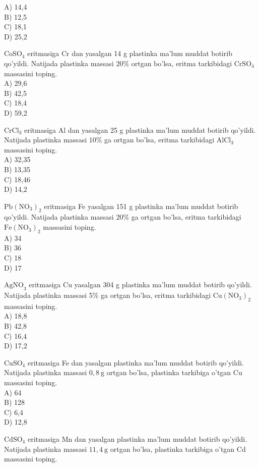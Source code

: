 A) 14,4\\
B) 12,5\\
C) 18,1\\
D) 25,2
  \item $\mathrm{CoSO}_{4}$ eritmasiga Cr dan yasalgan 14 g plastinka ma'lum muddat botirib qo'yildi. Natijada plastinka massasi $20 \%$ ortgan bo'lsa, eritma tarkibidagi $\mathrm{CrSO}_{4}$ massasini toping.\\
A) 29,6\\
B) 42,5\\
C) 18,4\\
D) 59,2
  \item $\mathrm{CrCl}_{3}$ eritmasiga Al dan yasalgan 25 g plastinka ma'lum muddat botirib qo'yildi. Natijada plastinka massasi $10 \%$ ga ortgan bo'lsa, eritma tarkibidagi $\mathrm{AlCl}_{3}$ massasini toping.\\
A) 32,35\\
B) 13,35\\
C) 18,46\\
D) 14,2
  \item $\mathrm{Pb}\left(\mathrm{NO}_{3}\right)_{2}$ eritmasiga Fe yasalgan 151 g plastinka ma'lum muddat botirib qo'yildi. Natijada plastinka massasi $20 \%$ ga ortgan bo'lsa, eritma tarkibidagi $\mathrm{Fe}\left(\mathrm{NO}_{3}\right)_{2}$ massasini toping.\\
A) 34\\
B) 36\\
C) 18\\
D) 17
  \item $\mathrm{AgNO}_{3}$ eritmasiga Cu yasalgan 304 g plastinka ma'lum muddat botirib qo'yildi. Natijada plastinka massasi 5\% ga ortgan bo'lsa, eritma tarkibidagi $\mathrm{Cu}\left(\mathrm{NO}_{3}\right)_{2}$ massasini toping.\\
A) 18,8\\
B) 42,8\\
C) 16,4\\
D) 17,2
  \item $\mathrm{CuSO}_{4}$ eritmasiga Fe dan yasalgan plastinka ma'lum muddat botirib qo'yildi. Natijada plastinka massasi $0,8 \mathrm{~g}$ ortgan bo'lsa, plastinka tarkibiga o'tgan Cu massasini toping.\\
A) 64\\
B) 128\\
C) 6,4\\
D) 12,8
  \item $\mathrm{CdSO}_{4}$ eritmasiga Mn dan yasalgan plastinka ma'lum muddat botirib qo'yildi. Natijada plastinka massasi $11,4 \mathrm{~g}$ ortgan bo'lsa, plastinka tarkibiga o'tgan Cd massasini toping.\\
